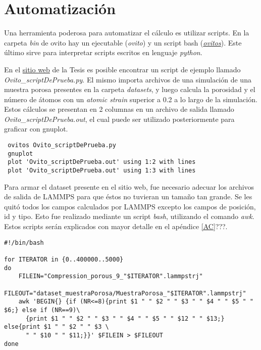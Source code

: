 \section{Automatización}
\label{AB_3}

Una herramienta poderosa para automatizar el cálculo es utilizar scripts. En la carpeta \textit{bin} de ovito hay un ejecutable (\textit{ovito}) y un script bash (\textit{\href{http://www.ovito.org/manual/python/introduction/running.html}{ovitos}}). Este último sirve para interpretar scripts escritos en lenguaje \textit{python}. 

En el \href{https://github.com/francoa/Tesis/tree/master/Resources}{sitio web} de la Tesis es posible encontrar un script de ejemplo llamado \textit{Ovito\_scriptDePrueba.py}. El mismo importa archivos de una simulación de una muestra porosa presentes en la carpeta \textit{datasets}, y luego calcula la porosidad y el número de átomos con un \textit{atomic strain} superior a 0.2 a lo largo de la simulación. Estos cálculos se presentan en 2 columnas en un archivo de salida llamado \textit{Ovito\_scriptDePrueba.out}, el cual puede ser utilizado posteriormente para graficar con gnuplot.

\begin{lstlisting}
 ovitos Ovito_scriptDePrueba.py
 gnuplot
 plot 'Ovito_scriptDePrueba.out' using 1:2 with lines
 plot 'Ovito_scriptDePrueba.out' using 1:3 with lines
\end{lstlisting}

Para armar el dataset presente en el sitio web, fue necesario adecuar los archivos de salida de LAMMPS para que éstos no tuvieran un tamaño tan grande. Se les quitó todos los campos calculados por LAMMPS excepto los campos de posición, id y tipo. Esto fue realizado mediante un script \textit{bash}, utilizando el comando \textit{awk}. Estos scripts serán explicados con mayor detalle en el apéndice \ref{AC}???.

\begin{lstlisting}
#!/bin/bash

for ITERATOR in {0..400000..5000}
do
	FILEIN="Compression_porous_9_"$ITERATOR".lammpstrj"
	FILEOUT="dataset_muestraPorosa/MuestraPorosa_"$ITERATOR".lammpstrj"
	awk 'BEGIN{} {if (NR<=8){print $1 " " $2 " " $3 " " $4 " " $5 " " $6;} else if (NR==9)\
	  {print $1 " " $2 " " $3 " " $4 " " $5 " " $12 " " $13;} else{print $1 " " $2 " " $3 \
	  " " $10 " " $11;}}' $FILEIN > $FILEOUT
done
\end{lstlisting}

